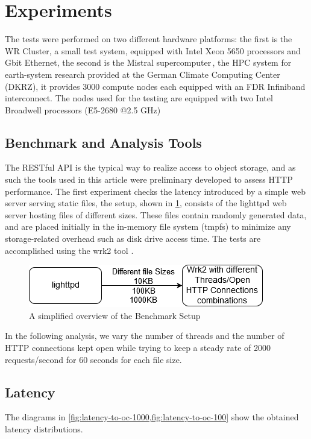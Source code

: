 \documentclass[runningheads]{llncs}
\begin{document}
\section{Experiments}
\label{sec:experiments}
The tests were performed on two different hardware platforms: the first is the WR Cluster, a small test system, equipped with Intel Xeon 5650 processors and Gbit Ethernet, the second is the Mistral supercomputer\,\cite{mistral}, the HPC system for earth-system research provided at the German Climate Computing Center (DKRZ), it provides 3000 compute nodes each equipped with an FDR Infiniband interconnect. The nodes used for the testing are equipped with two Intel Broadwell processors (E5-2680 @2.5 GHz) \cite{intel-xeon}

\subsection{Benchmark and Analysis Tools}\label{subsec:benchmark1}
The RESTful API is the typical way to realize access to object storage, and as such the tools used in this article were preliminary developed to assess HTTP performance.
The first experiment checks the latency introduced by a simple web server serving static files, the setup, shown in \cref{fig:wrk2bench}, consists of the lighttpd web server \cite{lighttpd} hosting files of different sizes. These files contain randomly generated data, and are placed initially in the in-memory file system (tmpfs) to minimize any storage-related overhead such as disk drive access time. The tests are accomplished using the wrk2 tool \cite{wrk2URL}.
\vspace{-1.5em}
\begin{figure}
\centering
\includegraphics[width=.6\linewidth]{wrk2bench.png}
\caption{A simplified overview of the Benchmark Setup}
\vspace{-1.5em}
\label{fig:wrk2bench}
\end{figure}
In the following analysis, we vary the number of threads and the number of HTTP connections kept open while trying to keep a steady rate of 2000 requests/second for 60 seconds for each file size.
\subsection{Latency}\label{subsec:latency}
The diagrams in \cref{fig:latency-to-oc-1000,fig:latency-to-oc-100} show the obtained latency distributions.
\end{document}
